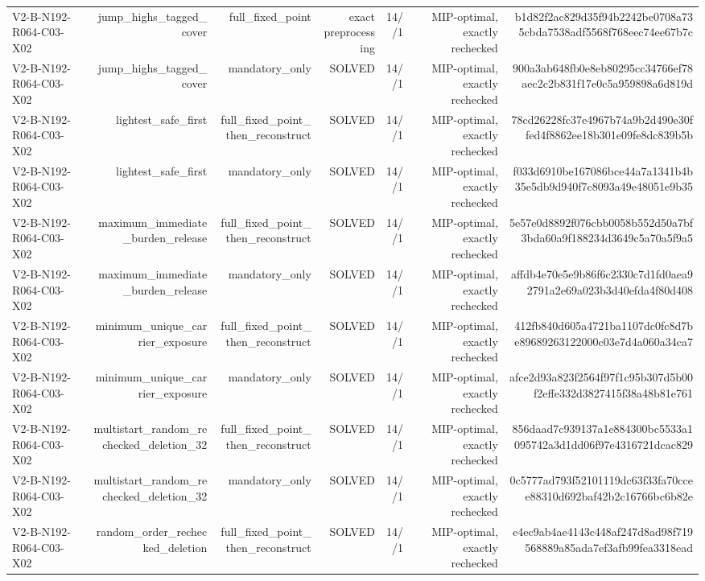 {\begin{longtable}{lrrrrrr}
V2-B-N192-R064-C03-X02 & jump\_highs\_tagged\_cover & full\_fixed\_point & exact preprocessing & 14//1 & MIP-optimal, exactly rechecked & b1d82f2ac829d35f94b2242be0708a735cbda7538adf5568f768eec74ee67b7c \\
V2-B-N192-R064-C03-X02 & jump\_highs\_tagged\_cover & mandatory\_only & SOLVED & 14//1 & MIP-optimal, exactly rechecked & 900a3ab648fb0e8eb80295cc34766ef78aec2c2b831f17e0c5a959898a6d819d \\
V2-B-N192-R064-C03-X02 & lightest\_safe\_first & full\_fixed\_point\_then\_reconstruct & SOLVED & 14//1 & MIP-optimal, exactly rechecked & 78cd26228fc37e4967b74a9b2d490e30ffed4f8862ee18b301e09fe8dc839b5b \\
V2-B-N192-R064-C03-X02 & lightest\_safe\_first & mandatory\_only & SOLVED & 14//1 & MIP-optimal, exactly rechecked & f033d6910be167086bce44a7a1341b4b35e5db9d940f7c8093a49e48051e9b35 \\
V2-B-N192-R064-C03-X02 & maximum\_immediate\_burden\_release & full\_fixed\_point\_then\_reconstruct & SOLVED & 14//1 & MIP-optimal, exactly rechecked & 5e57e0d8892f076cbb0058b552d50a7bf3bda60a9f188234d3649c5a70a5f9a5 \\
V2-B-N192-R064-C03-X02 & maximum\_immediate\_burden\_release & mandatory\_only & SOLVED & 14//1 & MIP-optimal, exactly rechecked & affdb4e70e5e9b86f6c2330c7d1fd0aea92791a2e69a023b3d40efda4f80d408 \\
V2-B-N192-R064-C03-X02 & minimum\_unique\_carrier\_exposure & full\_fixed\_point\_then\_reconstruct & SOLVED & 14//1 & MIP-optimal, exactly rechecked & 412fb840d605a4721ba1107dc0fc8d7be89689263122000c03e7d4a060a34ca7 \\
V2-B-N192-R064-C03-X02 & minimum\_unique\_carrier\_exposure & mandatory\_only & SOLVED & 14//1 & MIP-optimal, exactly rechecked & afce2d93a823f2564f97f1c95b307d5b00f2effe332d3827415f38a48b81e761 \\
V2-B-N192-R064-C03-X02 & multistart\_random\_rechecked\_deletion\_32 & full\_fixed\_point\_then\_reconstruct & SOLVED & 14//1 & MIP-optimal, exactly rechecked & 856daad7c939137a1e884300bc5533a1095742a3d1dd06f97e4316721dcac829 \\
V2-B-N192-R064-C03-X02 & multistart\_random\_rechecked\_deletion\_32 & mandatory\_only & SOLVED & 14//1 & MIP-optimal, exactly rechecked & 0c5777ad793f52101119dc63f33fa70ccee88310d692baf42b2c16766bc6b82e \\
V2-B-N192-R064-C03-X02 & random\_order\_rechecked\_deletion & full\_fixed\_point\_then\_reconstruct & SOLVED & 14//1 & MIP-optimal, exactly rechecked & e4ec9ab4ae4143c448af247d8ad98f719568889a85ada7ef3afb99fea3318ead \\

\end{longtable}}
